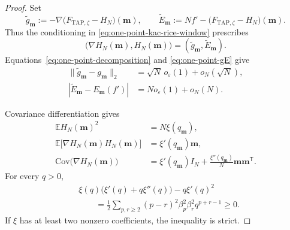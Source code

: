 \documentclass[a4paper,10pt,reqno]{amsart}
\numberwithin{equation}{section}
\newcommand{\ve}{\varepsilon}
\newcommand{\dE}{\mathbb{E}}%
\newcommand{\Cov}{\mathrm{Cov} }%
\newcommand{\TAP}{\mathrm{TAP}}
\newcommand{\bfm}{\mathbf{m}}
\begin{document}
	\begin{proof}
		Set
		\[
		\widetilde g_\bfm
		:=
		-\nabla\bigl(F_{\TAP,\zeta}-H_N\bigr)(\bfm),
		\qquad
		\widetilde E_\bfm
		:=
		Nf'-\bigl(F_{\TAP,\zeta}-H_N\bigr)(\bfm).
		\]
		Thus the conditioning in \eqref{eq:one-point-kac-rice-window}
		prescribes
		\[
		\bigl(\nabla H_N(\bfm),H_N(\bfm)\bigr)
		=
		(\widetilde g_\bfm,\widetilde E_\bfm).
		\]
		Equations~\eqref{eq:one-point-decomposition} and
		\eqref{eq:one-point-gE} give
		\begin{equation}\label{eq:one-point-exact-target}
			\begin{aligned}
				\|\widetilde g_\bfm-g_\bfm\|_2
				&=\sqrt N\,o_\ve(1)+o_N(\sqrt N),\\
				|\widetilde E_\bfm-E_\bfm(f')|
				&=N o_\ve(1)+o_N(N).
			\end{aligned}
		\end{equation}
		
		Covariance differentiation gives
		\begin{equation}\label{eq:one-point-field-covariance}
			\begin{aligned}
				\dE H_N(\bfm)^2
				&=N\xi(q_\bfm),\\
				\dE\bigl[\nabla H_N(\bfm)H_N(\bfm)\bigr]
				&=\xi'(q_\bfm)\bfm,\\
				\Cov\bigl(\nabla H_N(\bfm)\bigr)
				&=\xi'(q_\bfm)I_N
				+\frac{\xi''(q_\bfm)}N\bfm\bfm^{\mathsf T}.
			\end{aligned}
		\end{equation}
		For every \(q>0\),
		\begin{equation}\label{eq:one-point-covariance-nondegeneracy}
			\begin{aligned}
				&\xi(q)\bigl(\xi'(q)+q\xi''(q)\bigr)
				-q\xi'(q)^2\\
				&\qquad=
				\frac12\sum_{p,r\ge2}
				(p-r)^2\beta_p^2\beta_r^2q^{p+r-1}
				\ge0.
			\end{aligned}
		\end{equation}
		If \(\xi\) has at least two nonzero coefficients, the inequality is
		strict.
		

\end{proof}
\end{document}
